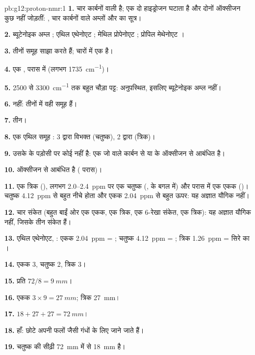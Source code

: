 \begin{solution}{pb:g12:proton-nmr:1}
\textbf{1.} चार कार्बनों वाली   है; एक 
दो हाइड्रोजन घटाता है और दोनों ऑक्सीजन कुछ नहीं जोड़तीं: ,
चार कार्बनों वाले अम्लों और  का सूत्र।

\textbf{2.} ब्यूटेनोइक अम्ल ; एथिल एथेनोएट
; मेथिल प्रोपेनोएट ; प्रोपिल
मेथेनोएट ।

\textbf{3.} तीनों   समूह साझा करते हैं; चारों में एक
 है।

\textbf{4.} एक ,  परास में (लगभग \qty{1735}{cm^{-1}})।

\textbf{5.} 2500 से \qty{3300}{cm^{-1}} तक बहुत चौड़ा  पट्ट:
अनुपस्थित, इसलिए ब्यूटेनोइक अम्ल नहीं।

\textbf{6.} नहीं: तीनों  में वही समूह हैं।

\textbf{7.} तीन।

\textbf{8.} एक एथिल समूह :  3
 द्वारा विभक्त (चतुष्क),  2 द्वारा (त्रिक)।

\textbf{9.} उसके  के पड़ोसी  पर कोई  नहीं है: एक
 जो  वाले कार्बन से या  के ऑक्सीजन से आबंधित है।

\textbf{10.}  ऑक्सीजन से आबंधित है ( परास)।

\textbf{11.} एक त्रिक (), लगभग 2.0--\qty{2.4}{ppm} पर एक चतुष्क
(,  के बगल में) और  परास में एक एकक
()। चतुष्क \qty{4.12}{ppm} से बहुत नीचे होता और
एकक \qty{2.04}{ppm} से बहुत ऊपर: यह अज्ञात यौगिक नहीं।

\textbf{12.} चार संकेत (बहुत बाईं ओर एक एकक, एक त्रिक, एक 6-रेखा
संकेत, एक त्रिक): यह अज्ञात यौगिक नहीं, जिसके तीन संकेत हैं।

\textbf{13.} एथिल एथेनोएट, : एकक
\qty{2.04}{ppm} = ; चतुष्क \qty{4.12}{ppm} = ;
त्रिक \qty{1.26}{ppm} = सिरे का ।

\textbf{14.} एकक 3, चतुष्क 2, त्रिक 3।

\textbf{15.} प्रति  $72 / 8 = \qty{9}{mm}$।

\textbf{16.} एकक $3 \times 9 = \qty{27}{mm}$; त्रिक
\qty{27}{mm}।

\textbf{17.} $18 + 27 + 27 = \qty{72}{mm}$।

\textbf{18.} हाँ: छोटे  अपनी फलों जैसी गंधों के लिए जाने जाते हैं।

\textbf{19.} चतुष्क की सीढ़ी \qty{72}{mm} में से \qty{18}{mm} है।
\end{solution}
